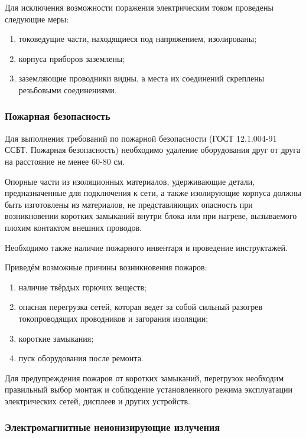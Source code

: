 Для исключения возможности поражения электрическим током проведены следующие меры:

\begin{enumerate}
\item токоведущие части, находящиеся под напряжением, изолированы;
\item корпуса приборов заземлены;
\item заземляющие проводники видны, а места их соединений скреплены резьбовыми соединениями.
\end{enumerate}
\subsubsection{Пожарная безопасность}

Для выполнения требований по пожарной безопасности (ГОСТ 12.1.004-91 ССБТ. Пожарная безопасность) необходимо удаление оборудования друг от друга на расстояние не менее 60-80 см.

Опорные части из изоляционных материалов, удерживающие детали, предназначенные для подключения к сети, а также изолирующие корпуса должны быть изготовлены из материалов, не представляющих опасность при возникновении коротких замыканий внутри блока или при нагреве, вызываемого плохим контактом внешних проводов.

Необходимо также наличие пожарного инвентаря и проведение инструктажей.

Приведём возможные причины возникновения пожаров:
\begin{enumerate}
\item наличие твёрдых горючих веществ;
\item опасная перегрузка сетей, которая ведет за собой сильный разогрев токопроводящих проводников и загорания изоляции;
\item короткие замыкания;
\item пуск оборудования после ремонта.
\end{enumerate}
Для предупреждения пожаров от коротких замыканий, перегрузок необходим правильный выбор монтаж и соблюдение установленного режима эксплуатации электрических сетей, дисплеев и других устройств.

\subsubsection{Электромагнитные неионизирующие излучения}

